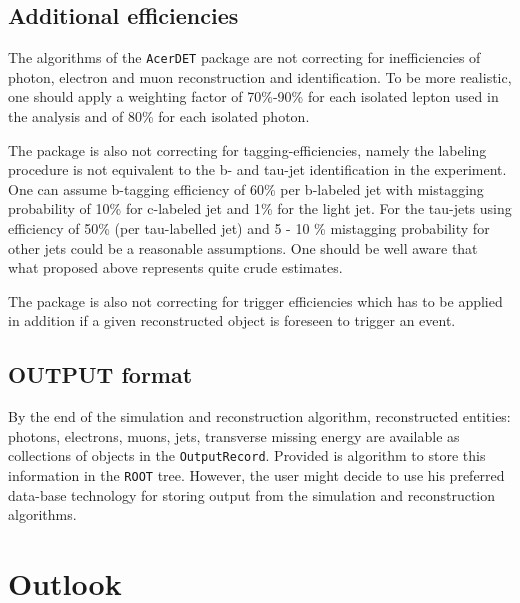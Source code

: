 \boldmath 
\subsection{Additional efficiencies}
\unboldmath

The algorithms of the {\tt AcerDET} package are not correcting for
inefficiencies of photon, electron and muon reconstruction and
identification. To be more realistic, one should apply a weighting
factor of 70\%-90\% for each isolated lepton used in the analysis and of
80\% for each isolated photon.

The package is also not correcting for tagging-efficiencies, namely
the labeling procedure is not equivalent to the b- and tau-jet
identification in the experiment. One can assume b-tagging efficiency 
of 60\% per b-labeled jet with mistagging probability of 10\% for
c-labeled jet and 1\% for the light jet.
For the tau-jets using efficiency of 50\% (per tau-labelled jet)
and 5 - 10 \% mistagging probability for other jets could be a reasonable
assumptions. One should be well aware that what proposed above 
represents quite crude estimates.

The package is also not correcting for trigger efficiencies which has
to be applied in addition if a given reconstructed object is foreseen to
trigger an event. 

\boldmath 
\subsection{OUTPUT format}
\unboldmath

By the end of the simulation and reconstruction algorithm,
reconstructed entities: photons, electrons, muons, jets, transverse
missing energy are available as collections of objects in the {\tt OutputRecord}.
Provided is algorithm to store this information in the {\tt ROOT} \cite{ROOT}
tree. However, the user might decide to
use his preferred data-base technology for storing output from the 
simulation and reconstruction algorithms.





\boldmath 
\section{Outlook}
\unboldmath

